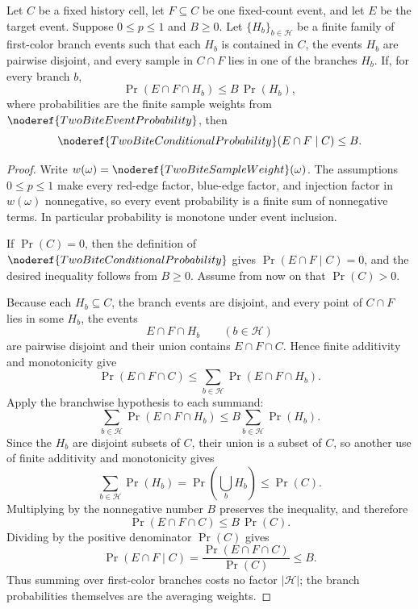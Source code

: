 \begin{helper}
Let \(C\) be a fixed history cell, let \(F\subseteq C\) be one fixed-count
event, and let \(E\) be the target event.  Suppose \(0\le p\le1\) and
\(B\ge0\).  Let \(\{H_b\}_{b\in\mathcal H}\) be a finite family of
first-color branch events such that each \(H_b\) is contained in \(C\), the
events \(H_b\) are pairwise disjoint, and every sample in \(C\cap F\) lies in
one of the branches \(H_b\).  If, for every branch \(b\),
\[
\Pr(E\cap F\cap H_b)\le B\,\Pr(H_b),
\]
where probabilities are the finite sample weights from
\(\noderef{TwoBiteEventProbability}\), then
\[
\noderef{TwoBiteConditionalProbability}(E\cap F\mid C)\le B.
\]
\end{helper}
\begin{proof}
Write \(w(\omega)=\noderef{TwoBiteSampleWeight}(\omega)\).  The assumptions
\(0\le p\le1\) make every red-edge factor, blue-edge factor, and injection
factor in \(w(\omega)\) nonnegative, so every event probability is a finite
sum of nonnegative terms.  In particular probability is monotone under
event inclusion.

If \(\Pr(C)=0\), then the definition of
\(\noderef{TwoBiteConditionalProbability}\) gives
\(\Pr(E\cap F\mid C)=0\), and the desired inequality follows from \(B\ge0\).
Assume from now on that \(\Pr(C)>0\).

Because each \(H_b\subseteq C\), the branch events are disjoint, and every
point of \(C\cap F\) lies in some \(H_b\), the events
\[
E\cap F\cap H_b\qquad (b\in\mathcal H)
\]
are pairwise disjoint and their union contains \(E\cap F\cap C\).  Hence
finite additivity and monotonicity give
\[
\Pr(E\cap F\cap C)
\le
\sum_{b\in\mathcal H}\Pr(E\cap F\cap H_b).
\]
Apply the branchwise hypothesis to each summand:
\[
\sum_{b\in\mathcal H}\Pr(E\cap F\cap H_b)
\le
B\sum_{b\in\mathcal H}\Pr(H_b).
\]
Since the \(H_b\) are disjoint subsets of \(C\), their union is a subset of
\(C\), so another use of finite additivity and monotonicity gives
\[
\sum_{b\in\mathcal H}\Pr(H_b)
=\Pr\!\left(\bigcup_b H_b\right)
\le \Pr(C).
\]
Multiplying by the nonnegative number \(B\) preserves the inequality, and
therefore
\[
\Pr(E\cap F\cap C)\le B\,\Pr(C).
\]
Dividing by the positive denominator \(\Pr(C)\) gives
\[
\Pr(E\cap F\mid C)
=\frac{\Pr(E\cap F\cap C)}{\Pr(C)}
\le B.
\]
Thus summing over first-color branches costs no factor \(|\mathcal H|\); the
branch probabilities themselves are the averaging weights.
\end{proof}
